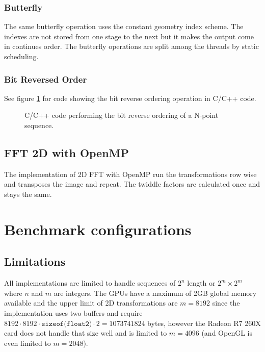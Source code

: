 \subsubsection{Butterfly}

The same butterfly operation uses the constant geometry index scheme. The indexes are not stored from one stage to the next but it makes the output come in continues order. The butterfly operations are split among the threads by static scheduling.

\subsubsection{Bit Reversed Order}

See figure \ref{fig:omp:bit-reverse-order} for code showing the bit reverse ordering operation in C/C++ code.

\begin{figure}[h!]
	\centering
	\begin{framed}
			
	\end{framed}
	\caption{ C/C++ code performing the bit reverse ordering of a N-point sequence. }
	\label{fig:omp:bit-reverse-order}
\end{figure}

\subsection{FFT 2D with OpenMP}

The implementation of 2D FFT with OpenMP run the transformations row wise and transposes the image and repeat. The twiddle factors are calculated once and stays the same.

\section{Benchmark configurations}

\subsection{Limitations}

All implementations are limited to handle sequences of $2^n$ length or $2^m \times 2^m$ where $n$ and $m$ are integers. The GPUs have a maximum of 2GB global memory available and the upper limit of 2D transformations are $m = 8192$ since the implementation uses two buffers and require $8192 \cdot 8192 \cdot \texttt{sizeof(float2)} \cdot 2 = 1073741824$ bytes, however the Radeon R7 260X card does not handle that size well and is limited to $m = 4096$ (and OpenGL is even limited to $m = 2048$).

